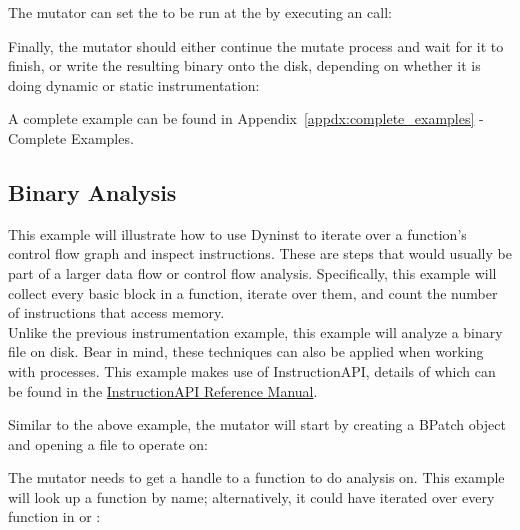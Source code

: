The mutator can set the \BPatchsnippet to be run at the \BPatchpoint by executing an \insertSnippet call:

Finally, the mutator should either continue the mutate process and wait for it to finish, or write the resulting binary onto the disk, depending on whether it is doing dynamic or static instrumentation:

A complete example can be found in Appendix~\ref{appdx:complete_examples} - Complete Examples.
 
\subsection{Binary Analysis}

This example will illustrate how to use Dyninst to iterate over a function’s control flow graph and inspect instructions.  These are steps that would usually be part of a larger data flow or control flow analysis.  Specifically, this example will collect every basic block in a function, iterate over them, and count the number of instructions that access memory.\\

Unlike the previous instrumentation example, this example will analyze a binary file on disk. Bear in mind, these techniques can also be applied when working with processes.  This example makes use of InstructionAPI, details of which can be found in the \underline{InstructionAPI Reference Manual}.

Similar to the above example, the mutator will start by creating a BPatch object and opening a file to operate on:

The mutator needs to get a handle to a function to do analysis on.  This example will look up a function by name; alternatively, it could have iterated over every function in \BPatchimage or \BPatchmodule:

